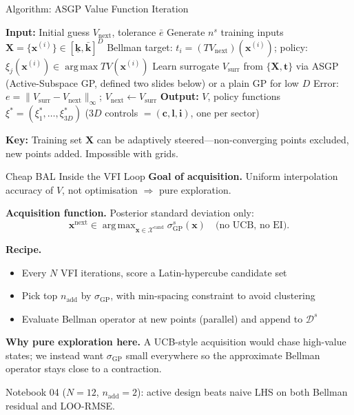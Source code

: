 \documentclass[aspectratio=169,11pt]{beamer}
\newcommand{\emphc}[1]{\textcolor{harvardcrimson}{#1}}
\newcommand{\x}{\bm{x}}
\newcommand{\X}{\bm{X}}
\DeclareMathOperator*{\argmax}{arg\,max}
\begin{document}
\begin{frame}[fragile]{Algorithm: ASGP Value Function Iteration}
\tiny
\begin{algorithmic}[1]
\STATE \textbf{Input:} Initial guess $V_{\text{next}}$, tolerance $\bar{e}$
    \STATE Generate $n^s$ training inputs $\X = \{\x^{(i)}\} \in [\underline{\bm{k}}, \bar{\bm{k}}]^D$
    \FOR{$\x^{(i)} \in \X$}
        \STATE Bellman target: $t_i = (TV_{\text{next}})(\x^{(i)})$; \quad policy: $\xi_j(\x^{(i)}) \in \argmax TV(\x^{(i)})$
    \ENDFOR
    \STATE Learn surrogate $V_{\text{surr}}$ from $\{\X, \bm{t}\}$ via ASGP (Active-Subspace GP, defined two slides below) or a plain GP for low $D$
    \STATE Error: $e = \|V_{\text{surr}} - V_{\text{next}}\|_\infty$; \quad $V_{\text{next}} \leftarrow V_{\text{surr}}$
\ENDWHILE
\STATE \textbf{Output:} $V$, policy functions $\xi^* = (\xi_1^*, \ldots, \xi_{3D}^*)$ \quad ($3D$ controls $=(\bm c, \bm l, \bm i)$, one per sector)
\end{algorithmic}

\vspace{0.3em}
{\scriptsize \textbf{Key:} Training set $\X$ can be \emphc{adaptively steered}---non-converging points excluded, new points added. Impossible with grids.}
\end{frame}

\begin{frame}{Cheap BAL Inside the VFI Loop}
\textbf{Goal of acquisition.} Uniform interpolation accuracy of $V$, not optimisation $\Rightarrow$ pure exploration.

\medskip
\textbf{Acquisition function.} Posterior standard deviation only:
\[
\x^{\text{next}} \in \argmax_{\x \in \mathcal{X}^{\text{cand}}} \sigma_{\text{GP}}^s(\x)
\quad \text{(no UCB, no EI).}
\]

\medskip
\textbf{Recipe.}
\begin{itemize}\itemsep0pt
  \item Every $N$ VFI iterations, score a Latin-hypercube candidate set
  \item Pick top $n_{\text{add}}$ by $\sigma_{\text{GP}}$, with min-spacing constraint to avoid clustering
  \item Evaluate Bellman operator at new points (parallel) and append to $\mathcal{D}^s$
\end{itemize}

\medskip
\textbf{Why pure exploration here.} A UCB-style acquisition would chase high-value states; we instead want $\sigma_{\text{GP}}$ small \emphc{everywhere} so the approximate Bellman operator stays close to a contraction.

\medskip
{\scriptsize Notebook 04 ($N=12$, $n_{\text{add}}=2$): active design beats naive LHS on both Bellman residual and LOO-RMSE.}
\end{frame}
\end{document}
